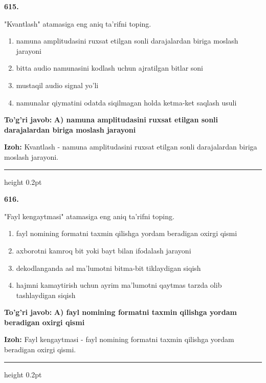 \documentclass[10pt,a4paper,oneside]{article}
\begin{document}
\noindent\textbf{\color{ink}615.}
\par
"Kvantlash" atamasiga eng aniq ta'rifni toping.
\begin{enumerate}[label=\Alph*),leftmargin=9mm]
\item namuna amplitudasini ruxsat etilgan sonli darajalardan biriga moslash jarayoni
\item bitta audio namunasini kodlash uchun ajratilgan bitlar soni
\item mustaqil audio signal yo'li
\item namunalar qiymatini odatda siqilmagan holda ketma-ket saqlash usuli
\end{enumerate}
\begin{tcolorbox}[enhanced,breakable,colback=teal!4,colframe=teal!50!black,boxrule=0.5pt,arc=1.1mm,left=3mm,right=3mm,top=1.7mm,bottom=1.7mm,before skip=2mm,after skip=2mm]
\textbf{\color{teal}To'g'ri javob:} \textbf{A) namuna amplitudasini ruxsat etilgan sonli darajalardan biriga moslash jarayoni}
\par\smallskip
\textbf{Izoh:} Kvantlash - namuna amplitudasini ruxsat etilgan sonli darajalardan biriga moslash jarayoni.
\end{tcolorbox}
\vspace{2mm}\hrule height 0.2pt \vspace{3mm}

\noindent\textbf{\color{ink}616.}
\par
"Fayl kengaytmasi" atamasiga eng aniq ta'rifni toping.
\begin{enumerate}[label=\Alph*),leftmargin=9mm]
\item fayl nomining formatni taxmin qilishga yordam beradigan oxirgi qismi
\item axborotni kamroq bit yoki bayt bilan ifodalash jarayoni
\item dekodlanganda asl ma'lumotni bitma-bit tiklaydigan siqish
\item hajmni kamaytirish uchun ayrim ma'lumotni qaytmas tarzda olib tashlaydigan siqish
\end{enumerate}
\begin{tcolorbox}[enhanced,breakable,colback=teal!4,colframe=teal!50!black,boxrule=0.5pt,arc=1.1mm,left=3mm,right=3mm,top=1.7mm,bottom=1.7mm,before skip=2mm,after skip=2mm]
\textbf{\color{teal}To'g'ri javob:} \textbf{A) fayl nomining formatni taxmin qilishga yordam beradigan oxirgi qismi}
\par\smallskip
\textbf{Izoh:} Fayl kengaytmasi - fayl nomining formatni taxmin qilishga yordam beradigan oxirgi qismi.
\end{tcolorbox}
\vspace{2mm}\hrule height 0.2pt \vspace{3mm}
\end{document}
